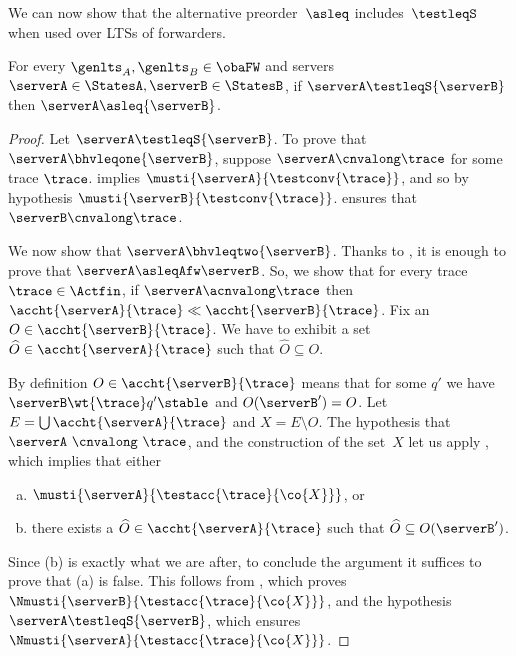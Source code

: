 We can now show that the alternative preorder~$\asleq$
includes~$\testleqS$ when used over LTSs of forwarders.
\begin{lemma}%
  \label{lem:completeness}
  For every $\genlts_A, \genlts_B \in \obaFW$ and
  servers $\serverA \in \StatesA, \serverB \in \StatesB $,
  if ${ \serverA } \testleqS { \serverB }$
  then ${ \serverA } \asleq { \serverB }$.
\end{lemma}
\begin{proof}
  Let ${ \serverA } \testleqS { \serverB }$.
  To prove that ${ \serverA } \bhvleqone { \serverB }$,
  suppose
  ${\serverA} \cnvalong \trace$ for some trace $\trace$.
   implies $\musti{ {\serverA} }{\testconv{ \trace} }$,
  and so by hypothesis $ \musti{ { \serverB } }{\testconv{ \trace }}$.
   ensures that ${\serverB} \cnvalong \trace$.

  We now show that ${ \serverA } \bhvleqtwo { \serverB }$.
  Thanks to
  , it is enough to prove
  that $\serverA \asleqAfw \serverB$. So, we show that
  for every trace $\trace \in \Actfin$, if ${ \serverA } \acnvalong \trace$
  then $\accht{{ \serverA }}{\trace} \ll
  \accht{{ \serverB }}{\trace} $.
  Fix an $O \in \accht{ {\serverB} }{ \trace }$.
  We have to exhibit a set $\widehat{O} \in \accht{{ \serverA
  }}{\trace}$ such that $\widehat{O} \subseteq O$.


  By definition $O \in \accht{ {\serverB} }{ \trace }$
  means that for some $q'$ we have ${\serverB} \wt{ \trace } q' \stable$
  and $O(\serverB') = O$.
  Let $E = \bigcup \accht{ { \serverA }}{\trace}$ and $X = E \setminus O $.
  The hypothesis that ${\serverA}~\cnvalong~\trace$,
  and the construction of the set~$X$
  let us apply , which implies that
  either \begin{enumerate}[(a)] \item
  $\musti{{\serverA}}{\testacc{\trace}{ \co{ X }}}$, or
  \item there exists
  a $\widehat{O} \in \accht{{ \serverA }}{\trace}$ such that $\widehat{O}
  \subseteq O(\serverB')$.
  \end{enumerate}
  Since (b) is exactly what we are after, to conclude the
  argument it suffices to prove that (a) is false.
  This follows from , which proves
  $\Nmusti{ {\serverB}  }{ \testacc{ \trace }{ \co{ X }} }$,
  and the hypothesis ${ \serverA } \testleqS { \serverB }$,
  which ensures  $\Nmusti{ {\serverA}  }{ \testacc{ \trace }{ \co{ X }} }$.
\end{proof}

